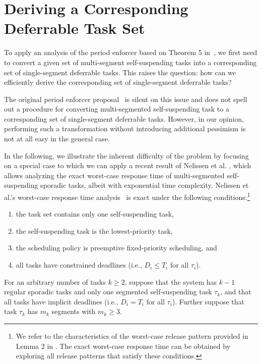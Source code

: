 
\section{Deriving a Corresponding Deferrable Task Set}
\label{sec:convert}

To apply an analysis of the period enforcer based on Theorem 5 in~\cite{Raj:suspension1991}, we first need to convert a given set of multi-segment self-suspending tasks into a corresponding set of single-segment deferrable tasks. This raises the question: how can we efficiently derive the corresponding set of single-segment deferrable tasks? 

The original period enforcer proposal~\cite{Raj:suspension1991} is silent on this issue and does not spell out a procedure for converting  multi-segmented self-suspending task to a corresponding set of single-segment deferrable tasks. However, in our opinion, performing such a transformation without introducing additional pessimism is not at all easy in the general case.

In the following, we illustrate the inherent difficulty of the problem by focusing on a special case to which we can apply a recent result of Nelissen et al. \cite{ecrts15nelissen}, which allows analyzing the exact worst-case response time of multi-segmented self-suspending sporadic tasks, albeit with exponential time complexity. 
Nelissen et al.'s worst-case response time analysis~\cite{ecrts15nelissen} is exact under the following conditions:\footnote{We refer to the characteristics of the worst-case release pattern provided in Lemma 2 in \cite{ecrts15nelissen}. The exact worst-case response time can be obtained by exploring all  release patterns that satisfy these conditions.} 
\begin{enumerate}
	\item the task set contains only one self-suspending task, 
	\item the self-suspending task is the lowest-priority task, 
	\item the scheduling policy is preemptive fixed-priority scheduling, and 
	\item all tasks have constrained deadlines (i.e., $D_i \leq T_i$ for all $\tau_i$).
\end{enumerate}

For an arbitrary number of tasks $k \geq 2$, 
suppose that the system has $k-1$ regular sporadic tasks and only one segmented self-suspending task $\tau_k$, and that all tasks have implicit deadlines (i.e., $D_i = T_i$ for all $\tau_i$). Further suppose that task $\tau_k$ has $m_k$ segments with $m_k \geq 3$.  


